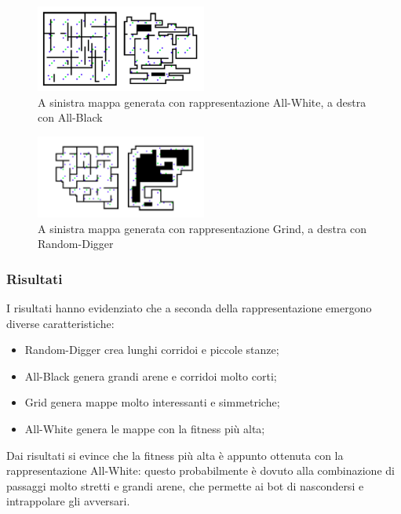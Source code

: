 \documentclass[12pt, italian]{toptesi}
\begin{document}
\begin{figure}
\centering
\includegraphics[width=0.5\textwidth]{all_white_black}
\caption{A sinistra mappa generata con rappresentazione All-White, a destra con All-Black}
\label{fig:all_white_black}
\end{figure}

\begin{figure}
\centering
\includegraphics[width=0.5\textwidth]{grind_digger}
\caption{A sinistra mappa generata con rappresentazione Grind, a destra con Random-Digger}
\label{fig:grind_digger}
\end{figure}

\subsubsection{Risultati}
I risultati hanno evidenziato che a seconda della rappresentazione emergono diverse caratteristiche:
\begin{itemize}
\item Random-Digger crea lunghi corridoi e piccole stanze;
\item All-Black genera grandi arene e corridoi molto corti;
\item Grid genera mappe molto interessanti e simmetriche;
\item All-White genera le mappe con la fitness più alta;
\end{itemize}
Dai risultati si evince che la fitness più alta è appunto ottenuta con la rappresentazione All-White: questo probabilmente è dovuto alla combinazione di passaggi molto stretti e grandi arene, che permette ai bot di nascondersi e intrappolare gli avversari.
\end{document}
